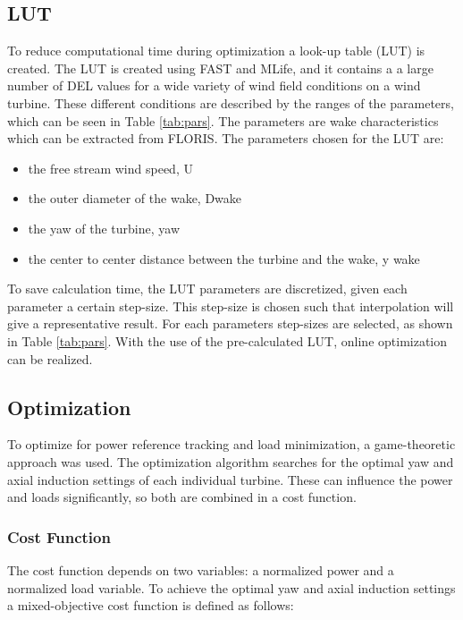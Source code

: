 \subsection{LUT}
 To reduce computational time during optimization a look-up table (LUT) is created. The LUT is created using FAST and MLife, and it contains a a large number of DEL values for a wide variety of wind field conditions on a wind turbine.
These different conditions are described by the ranges of the parameters, which can be seen in Table \ref{tab:pars}. The parameters are wake characteristics which can be extracted from FLORIS. The parameters chosen for the LUT are:\begin{itemize}
	\item the free stream wind speed, U
	\item the outer diameter of the wake, Dwake
	\item the yaw of the turbine, yaw  
	\item the center to center distance between the turbine and the wake, y wake 
\end{itemize}   
 To save calculation time, the LUT parameters are discretized, given each parameter a certain step-size. This step-size is chosen such that interpolation will give a representative result. For each parameters step-sizes are selected, as shown in Table \ref{tab:pars}. With the use of the pre-calculated LUT, online optimization can be realized.

\subsection{Optimization}
To optimize for power reference tracking and load minimization, a game-theoretic approach was used.\cite{Marden2013} The optimization algorithm searches for the optimal yaw and axial induction settings of each individual turbine. These can influence the power and loads significantly, so both are combined in a cost function. \cite{Marden2013}\cite{Dijk2016} 

\subsubsection{Cost Function}
The cost function depends on two variables: a normalized power and a normalized load variable. To achieve the optimal yaw and axial induction settings a mixed-objective cost function is defined as follows:


